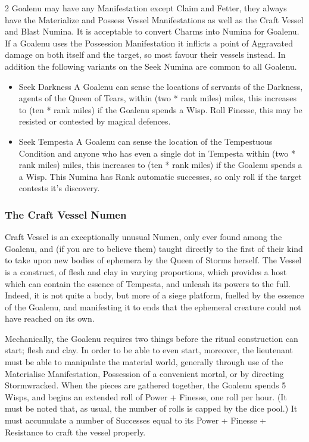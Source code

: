\begin{multicols}{2}
Goalenu may have any Manifestation except Claim and Fetter, they always have the Materialize and Possess Vessel Manifestations as well as the Craft Vessel and Blast Numina. It is acceptable to convert Charms into Numina for Goalenu. If a Goalenu uses the Possession Manifestation it inflicts a point of Aggravated damage on both itself and the target, so most favour their vessels instead. In addition the following variants on the Seek Numina are common to all Goalenu.

   \begin{itemize}
    \item  Seek Darkness \textendash A Goalenu can sense the locations of servants of the Darkness, agents of the Queen of Tears, within (two * rank miles) miles, this increases to (ten * rank miles) if the Goalenu spends a Wisp. Roll Finesse, this may be resisted or contested by magical defences. 
    
    \item Seek Tempesta \textendash A Goalenu can sense the location of the Tempestuous Condition and anyone who has even a single dot in Tempesta within (two * rank miles) miles, this increases to (ten * rank miles) if the Goalenu spends a a Wisp. This Numina has Rank automatic successes, so only roll if the target contests it's discovery. \end{itemize}

\subsubsection*{The Craft Vessel Numen}

Craft Vessel is an exceptionally unusual Numen, only ever found among the Goalenu, and (if you are to believe them) taught directly to the first of their kind to take upon new bodies of ephemera by the Queen of Storms herself. The Vessel is a construct, of flesh and clay in varying proportions, which provides a host which can contain the essence of Tempesta, and unleash its powers to the full. Indeed, it is not quite a body, but more of a siege platform, fuelled by the essence of the Goalenu, and manifesting it to ends that the ephemeral creature could not have reached on its own.

Mechanically, the Goalenu requires two things before the ritual construction can start; flesh and clay. In order to be able to even start, moreover, the lieutenant must be able to manipulate the material world, generally through use of the Materialise Manifestation, Possession of a convenient mortal, or by directing Stormwracked. When the pieces are gathered together, the Goalenu spends 5 Wisps, and begins an extended roll of Power + Finesse, one roll per hour. (It must be noted that, as usual, the number of rolls is capped by the dice pool.) It must accumulate a number of Successes equal to its Power + Finesse + Resistance to craft the vessel properly.


\end{multicols}
